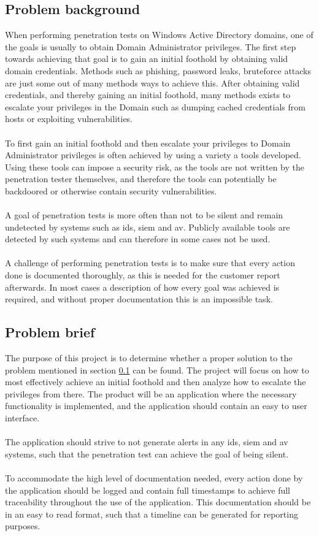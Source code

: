 \documentclass{article}
\begin{document}
\subsection{Problem background}
\label{sec:problem-background}
When performing penetration tests on Windows Active Directory domains, one of the goals is usually to obtain Domain Administrator privileges. The first step towards achieving that goal is to gain an initial foothold by obtaining valid domain credentials. Methods such as phishing, password leaks, bruteforce attacks are just some out of many methods ways to achieve this. After obtaining valid credentials, and thereby gaining an initial foothold, many methods exists to escalate your privileges in the Domain such as dumping cached credentials from hosts or exploiting vulnerabilities.
\\\\
To first gain an initial foothold and then escalate your privileges to Domain Administrator privileges is often achieved by using a variety a tools developed. Using these tools can impose a security risk, as the tools are not written by the penetration tester themselves, and therefore the tools can potentially be backdoored or otherwise contain security vulnerabilities.
\\\\
A goal of penetration tests is more often than not to be silent and remain undetected by systems such as \gls{ids}, \gls{siem} and \gls{av}. Publicly available tools are detected by such systems and can therefore in some cases not be used.
\\\\
A challenge of performing penetration tests is to make sure that every action done is documented thoroughly, as this is needed for the customer report afterwards. In most cases a description of how every goal was achieved is required, and without proper documentation this is an impossible task.


\subsection{Problem brief}
The purpose of this project is to determine whether a proper solution to the problem mentioned in section \ref{sec:problem-background} can be found. The project will focus on how to most effectively achieve an initial foothold and then analyze how to escalate the privileges from there. The product will be an application where the necessary functionality is implemented, and the application should contain an easy to user interface.
\\\\
The application should strive to not generate alerts in any \gls{ids}, \gls{siem} and \gls{av} systems, such that the penetration test can achieve the goal of being silent.
\\\\
To accommodate the high level of documentation needed, every action done by the application should be logged and contain full timestamps to achieve full traceability throughout the use of the application. This documentation should be in an easy to read format, such that a timeline can be generated for reporting purposes.
\end{document}
